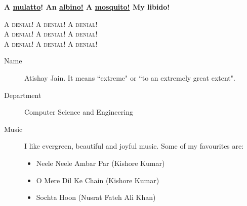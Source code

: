 \documentclass[]{article}
\begin{document}
\vspace{0.4 em}
\begin{center}
\hspace{5 em}\textbf{A \textcolor{brown!50!black}{\underline{mulatto}}! An \textcolor{white!60!black}{\underline{albino!}} A \underline{mosquito!} 
\textcolor{violet!64!black}{My libido!}}

\vspace{4 em}
\textsc{{\hspace{0.5 em}\large A denial! A denial! A denial!}
\vspace{1 em}
\\\hspace{1 em}\LARGE{A denial! A denial! A denial!}
\vspace{1 em}
\\\huge{A denial! A denial! A denial!}
}
\end{center}
\newpage
\begin{description}
\item [Name] Atishay Jain. It means ``extreme" or ``to an extremely great extent".
\item [Department] Computer Science and Engineering
\item [Music] I like evergreen, beautiful and joyful music. Some of my favourites are:
\begin{itemize}
    \item Neele Neele Ambar Par (Kishore Kumar)
    \item O Mere Dil Ke Chain (Kishore Kumar)
    \item Sochta Hoon (Nusrat Fateh Ali Khan)
\end{itemize}
\end{description}
\end{document}

